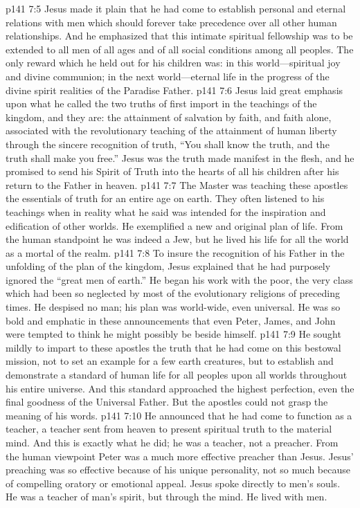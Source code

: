 \vs p141 7:5 Jesus made it plain that he had come to establish personal and eternal relations with men which should forever take precedence over all other human relationships. And he emphasized that this intimate spiritual fellowship was to be extended to all men of all ages and of all social conditions among all peoples. The only reward which he held out for his children was: in this world---spiritual joy and divine communion; in the next world---eternal life in the progress of the divine spirit realities of the Paradise Father.
\vs p141 7:6 Jesus laid great emphasis upon what he called the two truths of first import in the teachings of the kingdom, and they are: the attainment of salvation by faith, and faith alone, associated with the revolutionary teaching of the attainment of human liberty through the sincere recognition of truth, \textcolor{ubdarkred}{“You shall know the truth, and the truth shall make you free.”} Jesus was the truth made manifest in the flesh, and he promised to send his Spirit of Truth into the hearts of all his children after his return to the Father in heaven.
\vs p141 7:7 The Master was teaching these apostles the essentials of truth for an entire age on earth. They often listened to his teachings when in reality what he said was intended for the inspiration and edification of other worlds. He exemplified a new and original plan of life. From the human standpoint he was indeed a Jew, but he lived his life for all the world as a mortal of the realm.
\vs p141 7:8 To insure the recognition of his Father in the unfolding of the plan of the kingdom, Jesus explained that he had purposely ignored the “great men of earth.” He began his work with the poor, the very class which had been so neglected by most of the evolutionary religions of preceding times. He despised no man; his plan was world\hyp{}wide, even universal. He was so bold and emphatic in these announcements that even Peter, James, and John were tempted to think he might possibly be beside himself.
\vs p141 7:9 He sought mildly to impart to these apostles the truth that he had come on this bestowal mission, not to set an example for a few earth creatures, but to establish and demonstrate a standard of human life for all peoples upon all worlds throughout his entire universe. And this standard approached the highest perfection, even the final goodness of the Universal Father. But the apostles could not grasp the meaning of his words.
\vs p141 7:10 He announced that he had come to function as a teacher, a teacher sent from heaven to present spiritual truth to the material mind. And this is exactly what he did; he was a teacher, not a preacher. From the human viewpoint Peter was a much more effective preacher than Jesus. Jesus’ preaching was so effective because of his unique personality, not so much because of compelling oratory or emotional appeal. Jesus spoke directly to men’s souls. He was a teacher of man’s spirit, but through the mind. He lived with men.
